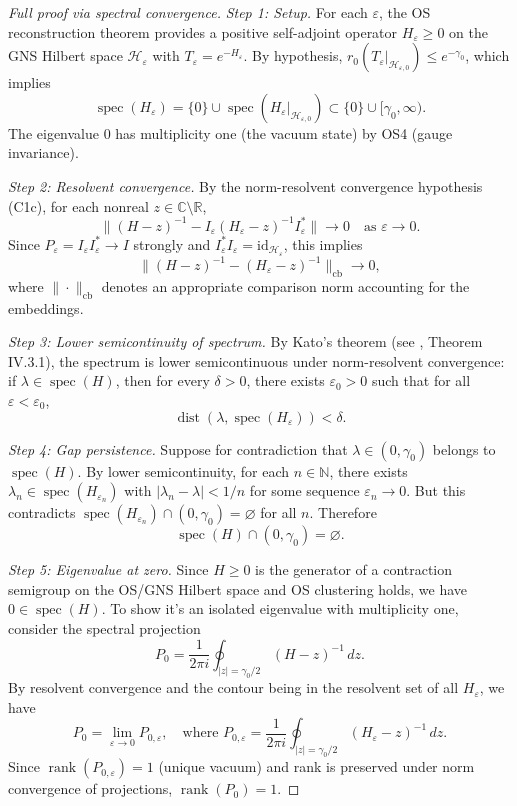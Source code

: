 \documentclass[11pt]{amsart}
\begin{document}
\begin{proof}[Full proof via spectral convergence]
\emph{Step 1: Setup.} For each $\varepsilon$, the OS reconstruction theorem provides a positive self-adjoint operator $H_{\varepsilon} \ge 0$ on the GNS Hilbert space $\mathcal{H}_{\varepsilon}$ with $T_{\varepsilon} = e^{-H_{\varepsilon}}$. By hypothesis, $r_0(T_{\varepsilon}|_{\mathcal{H}_{\varepsilon,0}}) \le e^{-\gamma_0}$, which implies
\[
  \operatorname{spec}(H_{\varepsilon}) = \{0\} \cup \operatorname{spec}(H_{\varepsilon}|_{\mathcal{H}_{\varepsilon,0}}) \subset \{0\} \cup [\gamma_0, \infty).
\]
The eigenvalue $0$ has multiplicity one (the vacuum state) by OS4 (gauge invariance).

\emph{Step 2: Resolvent convergence.} By the norm-resolvent convergence hypothesis (C1c), for each nonreal $z \in \mathbb{C} \setminus \mathbb{R}$,
\[
  \|(H - z)^{-1} - I_{\varepsilon}(H_{\varepsilon} - z)^{-1}I_{\varepsilon}^*\| \to 0 \quad \text{as } \varepsilon \to 0.
\]
Since $P_{\varepsilon} = I_{\varepsilon}I_{\varepsilon}^* \to I$ strongly and $I_{\varepsilon}^*I_{\varepsilon} = \mathrm{id}_{\mathcal{H}_{\varepsilon}}$, this implies
\[
  \|(H - z)^{-1} - (H_{\varepsilon} - z)^{-1}\|_{\text{cb}} \to 0,
\]
where $\|\cdot\|_{\text{cb}}$ denotes an appropriate comparison norm accounting for the embeddings.

\emph{Step 3: Lower semicontinuity of spectrum.} By Kato's theorem (see \cite{Kato1995}, Theorem IV.3.1), the spectrum is lower semicontinuous under norm-resolvent convergence: if $\lambda \in \operatorname{spec}(H)$, then for every $\delta > 0$, there exists $\varepsilon_0 > 0$ such that for all $\varepsilon < \varepsilon_0$,
\[
  \operatorname{dist}(\lambda, \operatorname{spec}(H_{\varepsilon})) < \delta.
\]

\emph{Step 4: Gap persistence.} Suppose for contradiction that $\lambda \in (0, \gamma_0)$ belongs to $\operatorname{spec}(H)$. By lower semicontinuity, for each $n \in \mathbb{N}$, there exists $\lambda_n \in \operatorname{spec}(H_{\varepsilon_n})$ with $|\lambda_n - \lambda| < 1/n$ for some sequence $\varepsilon_n \to 0$. But this contradicts $\operatorname{spec}(H_{\varepsilon_n}) \cap (0, \gamma_0) = \varnothing$ for all $n$. Therefore
\[
  \operatorname{spec}(H) \cap (0, \gamma_0) = \varnothing.
\]

\emph{Step 5: Eigenvalue at zero.} Since $H \ge 0$ is the generator of a contraction semigroup on the OS/GNS Hilbert space and OS clustering holds, we have $0 \in \operatorname{spec}(H)$. To show it's an isolated eigenvalue with multiplicity one, consider the spectral projection
\[
  P_0 = \frac{1}{2\pi i} \oint_{|z| = \gamma_0/2} (H - z)^{-1} \, dz.
\]
By resolvent convergence and the contour being in the resolvent set of all $H_{\varepsilon}$, we have
\[
  P_0 = \lim_{\varepsilon \to 0} P_{0,\varepsilon}, \quad \text{where } P_{0,\varepsilon} = \frac{1}{2\pi i} \oint_{|z| = \gamma_0/2} (H_{\varepsilon} - z)^{-1} \, dz.
\]
Since $\operatorname{rank}(P_{0,\varepsilon}) = 1$ (unique vacuum) and rank is preserved under norm convergence of projections, $\operatorname{rank}(P_0) = 1$.


\end{proof}
\end{document}
